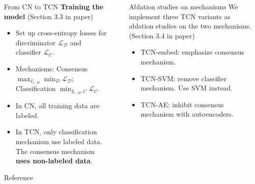 \documentclass[final]{beamer}
\newlength{\sepwid}
\newlength{\onecolwid}
\begin{document}
\begin{frame}[t]
\begin{columns}[t]
\begin{column}{\onecolwid}
\begin{block}{From CN to TCN}
\textbf{Training the model} (Section 3.3 in paper)
\begin{itemize}
    \item Set up cross-entropy losses for discriminator $\mathcal{L_D}$ and classifier $\mathcal{L_C}$.
    \item Mechanisms: Consensus $\displaystyle \max_{I_{1..M}}\min_{D} \mathcal{L_D}$; Classification $\displaystyle \min_{I_{1..M}, C} \mathcal{L_C}$.
    \item In CN, all training data are labeled.
    \item In TCN, only classification mechanism use labeled data. The consensus mechanism \textbf{uses non-labeled data}.
\end{itemize}

\end{block}

\begin{block}{Reference}


\end{block}


\end{column} %

\begin{column}{\sepwid}\end{column} %


\begin{column}{\onecolwid} %

\begin{block}{Ablation studies on mechanisms}
We implement three TCN variants as ablation studies on the two mechanisms. (Section 3.4 in paper)
\begin{itemize}
    \item TCN-embed: emphasize consensus mechanism.
    \item TCN-SVM: remove classifier mechanism. Use SVM instead.
    \item TCN-AE: inhibit consensus mechanism with autoencoders.
\end{itemize}
\end{block}


\end{column}
\end{columns}
\end{frame}
\end{document}
